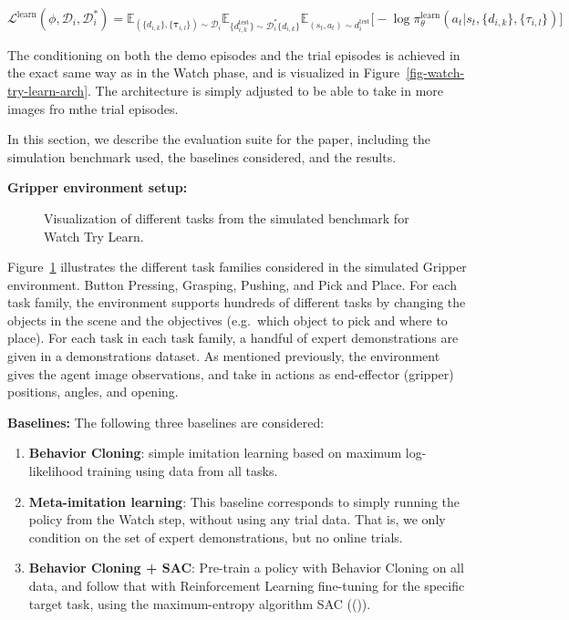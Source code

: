 \documentclass[
  letterpaper,
  numbers=noenddot,
  DIV=11]{scrreprt}
\makeatletter
\newcommand*\pandocbounded[1]{%
  \sbox\pandoc@box{#1}%
  \Gscale@div\@tempa{\textheight}{\dimexpr\ht\pandoc@box+\dp\pandoc@box\relax}%
  \Gscale@div\@tempb{\linewidth}{\wd\pandoc@box}%
  \ifdim\@tempb\p@<\@tempa\p@\let\@tempa\@tempb\fi%
  \ifdim\@tempa\p@<\p@\scalebox{\@tempa}{\usebox\pandoc@box}%
  \else\usebox{\pandoc@box}%
  \fi%
}
\theoremstyle{definition}
\theoremstyle{plain}
\theoremstyle{plain}
\theoremstyle{remark}
\makeatother
\begin{document}
\(\mathcal{L}^{\text{learn}}(\phi, \mathcal{D}_i, \mathcal{D}_i^*) = \mathbb{E}_{(\{d_{i,k}\}, \{\mathbf{\tau}_{i,l}\}) \sim \mathcal{D}_i} \mathbb{E}_{\{d_{i,k}^{\text{test}}\} \sim \mathcal{D}_i^* \{d_{i,k}\}} \mathbb{E}_{(s_t, a_t) \sim d_i^{\text{test}}} \big[
- \log \pi_\theta^{\text{learn}} (a_t | s_t, \{d_{i,k}\}, \{\tau_{i,l}\}) \big]\)

The conditioning on both the demo episodes and the trial episodes is
achieved in the exact same way as in the Watch phase, and is visualized
in Figure~\ref{fig-watch-try-learn-arch}. The architecture is simply
adjusted to be able to take in more images fro mthe trial episodes.

In this section, we describe the evaluation suite for the paper,
including the simulation benchmark used, the baselines considered, and
the results.

\textbf{Gripper environment setup:}

\begin{figure}

\centering{

\pandocbounded{\texttt{[image: src/Figures/watch-try-learn-envs.png]}}

}

\caption{\label{fig-envs}Visualization of different tasks from the
simulated benchmark for Watch Try Learn.}

\end{figure}%

Figure~\ref{fig-envs} illustrates the different task families considered
in the simulated Gripper environment. Button Pressing, Grasping,
Pushing, and Pick and Place. For each task family, the environment
supports hundreds of different tasks by changing the objects in the
scene and the objectives (e.g.~which object to pick and where to place).
For each task in each task family, a handful of expert demonstrations
are given in a demonstrations dataset. As mentioned previously, the
environment gives the agent image observations, and take in actions as
end-effector (gripper) positions, angles, and opening.

\textbf{Baselines:} The following three baselines are considered:

\begin{enumerate}
\def\labelenumi{\arabic{enumi}.}
\item
  \textbf{Behavior Cloning}: simple imitation learning based on maximum
  log-likelihood training using data from all tasks.
\item
  \textbf{Meta-imitation learning}: This baseline corresponds to simply
  running the policy from the Watch step, without using any trial data.
  That is, we only condition on the set of expert demonstrations, but no
  online trials.
\item
  \textbf{Behavior Cloning + SAC}: Pre-train a policy with Behavior
  Cloning on all data, and follow that with Reinforcement Learning
  fine-tuning for the specific target task, using the maximum-entropy
  algorithm SAC (()).
\end{enumerate}
\end{document}
